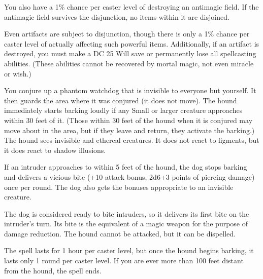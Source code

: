 \begin{multicols}{2}
\begin{small}
\smallskip\noindent You also have a 1\% chance per caster level of destroying an antimagic field. If the antimagic field survives the disjunction, no items within it are disjoined.

\smallskip\noindent Even artifacts are subject to disjunction, though there is only a 1\% chance per caster level of actually affecting such powerful items. Additionally, if an artifact is destroyed, you must make a DC 25 Will save or permanently lose all spellcasting abilities. (These abilities cannot be recovered by mortal magic, not even miracle or wish.)


\noindent You conjure up a phantom watchdog that is invisible to everyone but yourself. It then guards the area where it was conjured (it does not move). The hound immediately starts barking loudly if any Small or larger creature approaches within 30 feet of it. (Those within 30 feet of the hound when it is conjured may move about in the area, but if they leave and return, they activate the barking.) The hound sees invisible and ethereal creatures. It does not react to figments, but it does react to shadow illusions.

\smallskip\noindent If an intruder approaches to within 5 feet of the hound, the dog stops barking and delivers a vicious bite (+10 attack bonus, 2d6+3 points of piercing damage) once per round. The dog also gets the bonuses appropriate to an invisible creature.

\smallskip\noindent The dog is considered ready to bite intruders, so it delivers its first bite on the intruder's turn. Its bite is the equivalent of a magic weapon for the purpose of damage reduction. The hound cannot be attacked, but it can be dispelled.

\smallskip\noindent The spell lasts for 1 hour per caster level, but once the hound begins barking, it lasts only 1 round per caster level. If you are ever more than 100 feet distant from the hound, the spell ends.


\end{small}
\end{multicols}
